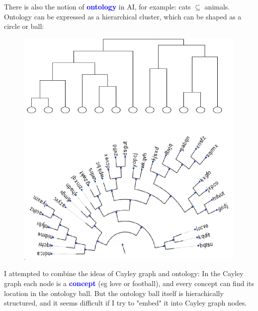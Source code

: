 \documentclass[12pt]{article}
\newcommand{\concept}[1]{\textbf{\textcolor{blue}{#1}}}
\newcommand{\formula}[1]{\textcolor{LogicColor}{#1}}
\begin{document}
There is also the notion of \concept{ontology} in AI, for example: \formula{cats $\subseteq$ animals}.  Ontology can be expressed as a hierarchical cluster, which can be shaped as a circle or ball:
\begin{figure}[H]
\centering
\includegraphics[scale=0.5]{ontology-ball.png}
\end{figure}

I attempted to combine the ideas of Cayley graph and ontology:  In the Cayley graph each node is a \concept{concept} (eg \formula{love} or \formula{football}), and every concept can find its location in the ontology ball.  But the ontology ball itself is hierachically structured, and it seems difficult if I try to "embed" it into Cayley graph nodes.
\end{document}
